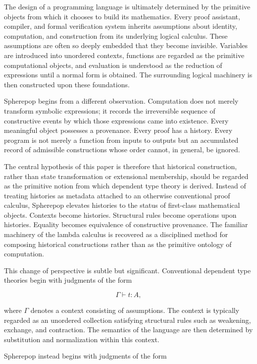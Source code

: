 \documentclass[12pt,oneside]{article}
\theoremstyle{definition}
\theoremstyle{remark}
\begin{document}
The design of a programming language is ultimately determined by the primitive objects from which it chooses to build its mathematics. Every proof assistant, compiler, and formal verification system inherits assumptions about identity, computation, and construction from its underlying logical calculus. These assumptions are often so deeply embedded that they become invisible. Variables are introduced into unordered contexts, functions are regarded as the primitive computational objects, and evaluation is understood as the reduction of expressions until a normal form is obtained. The surrounding logical machinery is then constructed upon these foundations.

Spherepop begins from a different observation. Computation does not merely transform symbolic expressions; it records the irreversible sequence of constructive events by which those expressions came into existence. Every meaningful object possesses a provenance. Every proof has a history. Every program is not merely a function from inputs to outputs but an accumulated record of admissible constructions whose order cannot, in general, be ignored.

The central hypothesis of this paper is therefore that historical construction, rather than state transformation or extensional membership, should be regarded as the primitive notion from which dependent type theory is derived. Instead of treating histories as metadata attached to an otherwise conventional proof calculus, Spherepop elevates histories to the status of first-class mathematical objects. Contexts become histories. Structural rules become operations upon histories. Equality becomes equivalence of constructive provenance. The familiar machinery of the lambda calculus is recovered as a disciplined method for composing historical constructions rather than as the primitive ontology of computation.

This change of perspective is subtle but significant. Conventional dependent type theories begin with judgments of the form

\[
\Gamma \vdash t : A,
\]

where $\Gamma$ denotes a context consisting of assumptions. The context is typically regarded as an unordered collection satisfying structural rules such as weakening, exchange, and contraction. The semantics of the language are then determined by substitution and normalization within this context.

Spherepop instead begins with judgments of the form
\end{document}
